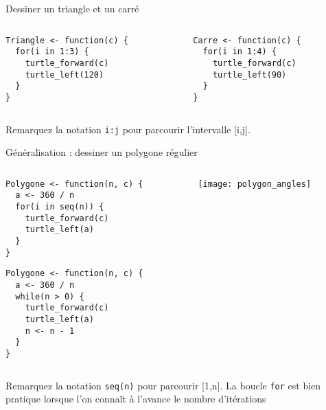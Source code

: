 \documentclass[10pt]{beamer}
\begin{document}
\begin{frame}[fragile]{Dessiner un triangle et un carré}

\begin{columns}[t]
\begin{column}{0.48\textwidth}
  \begin{lstlisting}[style=edblock]
Triangle <- function(c) {
  for(i in 1:3) {
    turtle_forward(c)
    turtle_left(120)
  }
}
\end{lstlisting}

\end{column}
\begin{column}{0.48\textwidth}
  \begin{lstlisting}[style=edblock]
Carre <- function(c) {
  for(i in 1:4) {
    turtle_forward(c)
    turtle_left(90)
  }
}
\end{lstlisting}

\end{column}
\end{columns}


Remarquez la notation \lstinline!i:j! pour parcourir l'intervalle [i,j].

\end{frame}

\begin{frame}[fragile]{Généralisation : dessiner un polygone régulier}


\begin{columns}[c]
\begin{column}{0.48\textwidth}
\begin{lstlisting}[style=editor]
Polygone <- function(n, c) {
  a <- 360 / n
  for(i in seq(n)) {
    turtle_forward(c)
    turtle_left(a)
  }
}
\end{lstlisting}

\begin{lstlisting}[style=editor]
Polygone <- function(n, c) {
  a <- 360 / n
  while(n > 0) {
    turtle_forward(c)
    turtle_left(a)
    n <- n - 1
  }
}
\end{lstlisting}
\end{column}
\begin{column}{0.48\textwidth}
\texttt{[image: polygon\_angles]}
\end{column}
\end{columns}

Remarquez la notation \lstinline!seq(n)! pour parcourir [1,n].
La boucle \texttt{for} est bien pratique lorsque l'on connaît à l'avance le nombre d'itérations
\end{frame}
\end{document}
